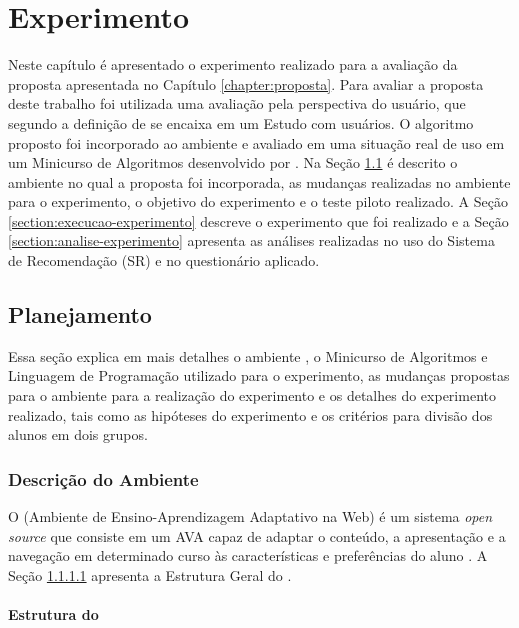 \chapter{Experimento}\label{chapter:experimento}

Neste capítulo é apresentado o experimento realizado para a avaliação da proposta apresentada no Capítulo \ref{chapter:proposta}.
Para avaliar a proposta deste trabalho foi utilizada uma avaliação pela perspectiva do usuário, que segundo a definição de
 se encaixa em um Estudo com usuários. O algoritmo proposto foi incorporado ao ambiente
\adaptwebspace e avaliado em uma situação real de uso em um Minicurso de Algoritmos desenvolvido por .
Na Seção \ref{section:planejamento-experimento} é descrito o ambiente \adaptwebspace no qual a proposta foi incorporada,
as mudanças realizadas no ambiente para o experimento, o objetivo do experimento e o teste piloto realizado. A Seção
\ref{section:execucao-experimento} descreve o experimento que foi realizado e a Seção \ref{section:analise-experimento} apresenta
as análises realizadas no uso do Sistema de Recomendação (SR) e no questionário aplicado.

\section{Planejamento}\label{section:planejamento-experimento}

Essa seção explica em mais detalhes o ambiente \adaptweb, o Minicurso de Algoritmos e Linguagem de Programação utilizado
para o experimento, as mudanças propostas para o ambiente para a realização do experimento e os detalhes do experimento
realizado, tais como as hipóteses do experimento e os critérios para divisão dos alunos em dois grupos.

\subsection{Descrição do Ambiente \adaptweb}

O \adaptwebspace (Ambiente de Ensino-Aprendizagem Adaptativo na Web) é um sistema \textit{open source}
que consiste em um AVA capaz de adaptar o conteúdo, a apresentação e a navegação em determinado curso às características
e preferências do aluno \cite{gasparini2009adaptweb}. A Seção \ref{subsection:estrutura-adaptweb} apresenta a Estrutura Geral do
\adaptweb.

\subsubsection{Estrutura do \adaptweb}\label{subsection:estrutura-adaptweb}


